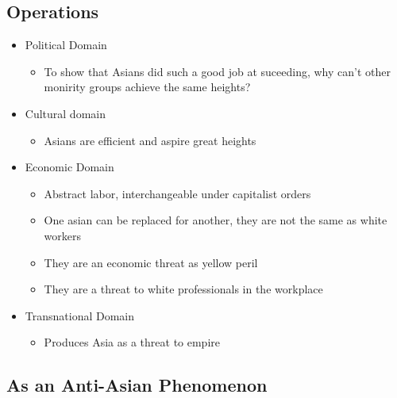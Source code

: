 \documentclass{article}
\begin{document}
\subsection{Operations}
\begin{itemize}
  \item Political Domain
    \begin{itemize}
      \item To show that Asians did such a good job at suceeding, why
        can't other monirity groups achieve the same heights?
    \end{itemize}

  \item Cultural domain
    \begin{itemize}
      \item Asians are efficient and aspire great heights
    \end{itemize}

  \item Economic Domain
    \begin{itemize}
      \item Abstract labor, interchangeable under capitalist orders
      \item One asian can be replaced for another,
        they are not the same as white workers
      \item They are an economic threat as yellow peril
      \item They are a threat to white professionals in the workplace
    \end{itemize}


  \item Transnational Domain
    \begin{itemize}
      \item Produces Asia as a threat to empire
    \end{itemize}
\end{itemize}

\subsection{As an Anti-Asian Phenomenon}
\end{document}
